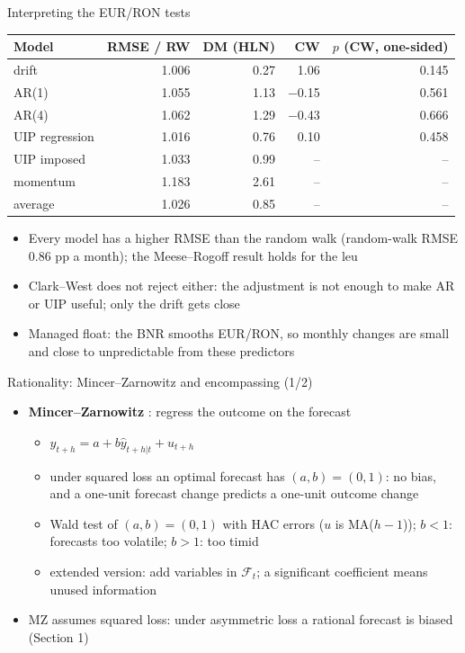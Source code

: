\begin{frame}{Interpreting the EUR/RON tests}
\itemsize{\footnotesize}
\begin{center}
\scriptsize
\begin{tabular}{lrrrr}
\toprule
\textbf{Model} & \textbf{RMSE / RW} & \textbf{DM (HLN)} & \textbf{CW} & \textbf{$p$ (CW, one-sided)} \\
\midrule
drift & 1.006 & 0.27 & 1.06 & 0.145 \\
AR(1) & 1.055 & 1.13 & \ensuremath{-}0.15 & 0.561 \\
AR(4) & 1.062 & 1.29 & \ensuremath{-}0.43 & 0.666 \\
UIP regression & 1.016 & 0.76 & 0.10 & 0.458 \\
UIP imposed & 1.033 & 0.99 & -- & -- \\
momentum & 1.183 & 2.61 & -- & -- \\
average & 1.026 & 0.85 & -- & -- \\
\bottomrule
\end{tabular}
\end{center}
\begin{itemize}
    \item Every model has a higher RMSE than the random walk (random-walk RMSE 0.86 pp a month); the Meese--Rogoff result holds for the leu
    \item Clark--West does not reject either: the adjustment is not enough to make AR or UIP useful; only the drift gets close
    \item Managed float: the BNR smooths EUR/RON, so monthly changes are small and close to unpredictable from these predictors
\end{itemize}
\end{frame}

\begin{frame}{Rationality: Mincer--Zarnowitz and encompassing (1/2)}
\itemsize{\small}
\begin{itemize}
    \item \textbf{Mincer--Zarnowitz} : regress the outcome on the forecast
    \begin{itemize}
        \item $y_{t+h} = a + b\hat y_{t+h|t} + u_{t+h}$
        \item under squared loss an optimal forecast has $(a, b) = (0, 1)$: no bias, and a one-unit forecast change predicts a one-unit outcome change
        \item Wald test of $(a, b) = (0, 1)$ with HAC errors ($u$ is MA($h - 1$)); $b < 1$: forecasts too volatile; $b > 1$: too timid
        \item extended version: add variables in $\mathcal{F}_t$; a significant coefficient means unused information
    \end{itemize}
    \item MZ assumes squared loss: under asymmetric loss a rational forecast is biased (Section 1)
\end{itemize}
\end{frame}

